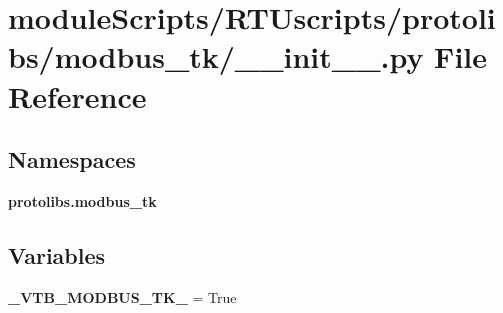 \section{module\+Scripts/\+R\+T\+Uscripts/protolibs/modbus\+\_\+tk/\+\_\+\+\_\+init\+\_\+\+\_\+.py File Reference}
\label{protolibs_2modbus__tk_2____init_____8py}
\subsection*{Namespaces}
\begin{DoxyCompactItemize}
\item 
 {\bf protolibs.\+modbus\+\_\+tk}
\end{DoxyCompactItemize}
\subsection*{Variables}
\begin{DoxyCompactItemize}
\item 
{\bf \+\_\+\+V\+T\+B\+\_\+\+M\+O\+D\+B\+U\+S\+\_\+\+T\+K\+\_\+} = True
\end{DoxyCompactItemize}
